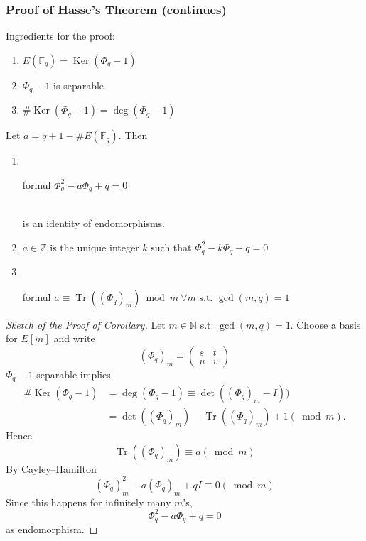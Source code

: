 \documentclass[12pt,handout]{beamer} %
\newcommand{\Z}{\mathbb Z}
\newcommand{\N}{\mathbb N}
\newcommand{\F}{\mathbb F}
\theoremstyle{definition}
\begin{document}
\begin{frame}
\frametitle{Proof of Hasse's Theorem (continues)}

\begin{beamerboxesrounded}[upper=block title example,lower=block body alerted,shadow=true]
{Ingredients for the proof:}\pause
\begin{enumerate}[<+-|alert@+>]
             \item $E(\F_q)=\operatorname{Ker}(\Phi_q-1)$
             \item $\Phi_q-1$ is separable
             \item $\#\operatorname{Ker}(\Phi_q-1)=\deg(\Phi_q-1)$
           \end{enumerate}
\end{beamerboxesrounded}\pause

\begin{corollary} Let $a=q+1-\#E(\F_q)$. Then
\begin{enumerate}[<+-|alert@+>]
             \item\
{\begin{beamercolorbox}[vmode,rounded=true,shadow=true,wd=3.2cm,center]{formul}
$\Phi_q^2-a\Phi_q+q=0$\end{beamercolorbox}}\\
\hfill is an identity of endomorphisms.
\item

$a\in\Z$ is the unique integer $k$ such that $\Phi_q^2-k\Phi_q+q=0$
\item\
{\begin{beamercolorbox}[rounded=true,shadow=true,wd=7cm,center]{formul}
$a\equiv\operatorname{Tr}((\Phi_q)_m)\bmod m\ \forall m\text{ s.t. }\gcd(m,q)=1$\end{beamercolorbox}}
\end{enumerate}
\end{corollary}
\end{frame}

\begin{frame}
\begin{proof}[Sketch of the Proof of Corollary]
Let $m\in\N$ s.t. $\gcd(m,q)=1$. Choose a basis for $E[m]$ and write
\alert{$$(\Phi_q)_m=\begin{pmatrix}s&t\\u&v\end{pmatrix}$$}\pause
$\Phi_q-1$ separable implies
\alert{
\begin{align*}
\#\operatorname{Ker}(\Phi_q-1)&=\deg(\Phi_q-1)\equiv\det((\Phi_q)_m-I))\\
                               &=\det((\Phi_q)_m)-\operatorname{Tr}((\Phi_q)_m)+1 (\bmod m).
\end{align*}
}\pause
Hence
\alert{$$\operatorname{Tr}((\Phi_q)_m)\equiv a(\bmod m)$$}\pause
By Cayley--Hamilton
\alert{$$(\Phi_q)_m^2-a(\Phi_q)_m+qI\equiv0(\bmod m)$$}\pause
Since this happens for infinitely many $m$'s,
\alert{$$\Phi_q^2-a\Phi_q+q=0$$}as endomorphism.\pause \end{proof}
\end{frame}
\end{document}
